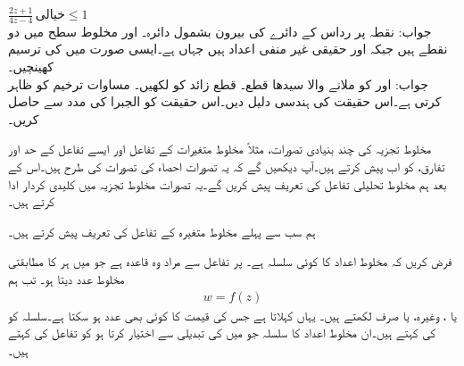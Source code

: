 \quad
$\tfrac{2z+1}{4z-4}\,\text{خیالی}\le 1$\\
جواب:\quad
نقطہ  پر رداس  کے دائرے کی بیرون بشمول دائرہ۔
\quad
{} اور  مخلوط سطح میں دو نقطے ہیں جبکہ  اور  حقیقی غیر منفی اعداد ہیں جہاں  ہے۔ایسی صورت میں  کی ترسیم کھینچیں۔\\
جواب:\quad
{} اور  کو ملانے والا سیدھا قطع۔
\quad
قطع زائد  کو  لکھیں۔
\quad
مساوات  ترخیم کو ظاہر کرتی ہے۔اس حقیقت کی ہندسی دلیل دیں۔اس حقیقت کو الجبرا کی مدد سے حاصل کریں۔ 

مخلوط تجزیہ کی چند بنیادی تصورات، مثلاً مخلوط متغیرات کے تفاعل اور ایسے تفاعل کے حد اور تفارق، کو اب پیش کرتے ہیں۔آپ دیکھیں گے کہ یہ تصورات احصاء کی تصورات کی طرح ہیں۔اس کے بعد ہم مخلوط تحلیلی تفاعل کی تعریف پیش کریں گے۔یہ تصورات مخلوط تجزیہ میں کلیدی کردار ادا کرتے ہیں۔

ہم سب سے پہلے مخلوط متغیرہ کے تفاعل کی تعریف پیش کرتے ہیں۔

فرض کریں کہ  مخلوط اعداد کا کوئی سلسلہ ہے۔ پر  تفاعل سے مراد وہ قاعدہ ہے  جو  میں ہر  کا مطابقتی   مخلوط عدد  دیتا ہو۔ تب ہم
\begin{align*}
w=f(z)
\end{align*}
یا ، وغیرہ، یا صرف  لکھتے ہیں۔ یہاں   کہلاتا ہے جس کی قیمت  کا کوئی بھی عدد ہو سکتا ہے۔سلسلہ  کو  کی  کہتے ہیں۔ان مخلوط اعداد کا سلسلہ جو  میں  کی تبدیلی سے  اختیار کرتا ہو کو تفاعل  کی  کہتے ہیں۔

